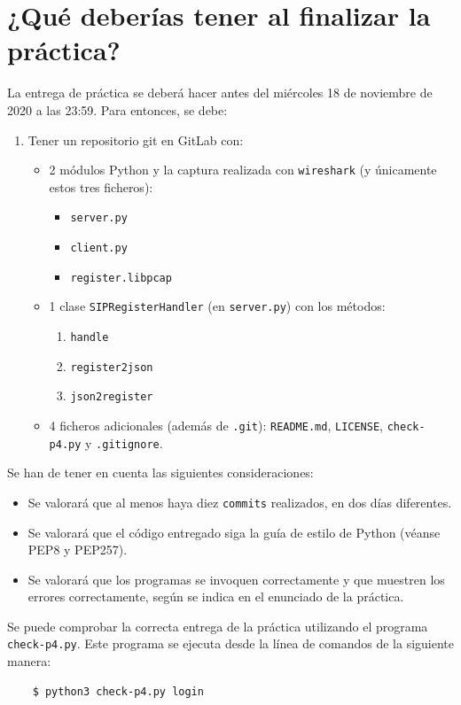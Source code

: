 \documentclass[11pt,a4paper]{article}
\begin{document}
\section{¿Qué deberías tener al finalizar la práctica?}

La entrega de práctica se deberá hacer antes del miércoles 18 de noviembre de 2020 a las 23:59. Para entonces, se debe: 

\begin{enumerate}
  \item Tener un repositorio git en GitLab con:
  \begin{itemize}
    \item 2 módulos Python y la captura realizada con \texttt{wireshark} (y únicamente estos tres ficheros):
    \begin{itemize}
      \item \texttt{server.py}
      \item \texttt{client.py}
      \item \texttt{register.libpcap}
    \end{itemize}
    \item 1 clase \texttt{SIPRegisterHandler} (en \texttt{server.py}) con los métodos:
    \begin{enumerate}
      \item \texttt{handle}
      \item \texttt{register2json}
      \item \texttt{json2register}
    \end{enumerate}
    \item 4 ficheros adicionales (además de \texttt{.git}): \texttt{README.md}, \texttt{LICENSE}, \texttt{check-p4.py} y \texttt{.gitignore}.
  \end{itemize}
\end{enumerate}

Se han de tener en cuenta las siguientes consideraciones:
\begin{itemize}
  \item Se valorará que al menos haya diez \texttt{commits} realizados, en dos días diferentes.
  \item Se valorará que el código entregado siga la guía de estilo de Python (véanse PEP8 y PEP257).
  \item Se valorará que los programas se invoquen correctamente y que muestren los errores correctamente, según se indica en el enunciado de la práctica.
\end{itemize}

Se puede comprobar la correcta entrega de la práctica utilizando el programa \texttt{check-p4.py}. Este programa se ejecuta desde la línea de comandos de la siguiente manera:
\begin{verbatim}
	$ python3 check-p4.py login
\end{verbatim}
\end{document}
